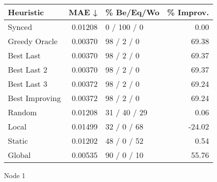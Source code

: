 \begin{tabular}{lrlr}
\toprule
\textbf{Heuristic} & \textbf{MAE ↓} & \textbf{\% Be/Eq/Wo} & \textbf{\% Improv.} \\
\midrule
            Synced &        0.01208 &          0 / 100 / 0 &                0.00 \\
     Greedy Oracle &        0.00370 &           98 / 2 / 0 &               69.38 \\
         Best Last &        0.00370 &           98 / 2 / 0 &               69.37 \\
       Best Last 2 &        0.00370 &           98 / 2 / 0 &               69.37 \\
       Best Last 3 &        0.00372 &           98 / 2 / 0 &               69.24 \\
    Best Improving &        0.00372 &           98 / 2 / 0 &               69.24 \\
            Random &        0.01208 &         31 / 40 / 29 &                0.06 \\
             Local &        0.01499 &          32 / 0 / 68 &              -24.02 \\
            Static &        0.01202 &          48 / 0 / 52 &                0.54 \\
            Global &        0.00535 &          90 / 0 / 10 &               55.76 \\
\bottomrule
\end{tabular}
\caption{Node 1}
\label{tab:non_lr05_le2_bs2_1}
